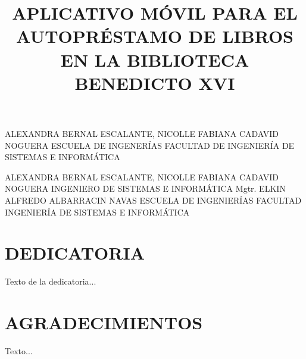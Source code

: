 \documentclass[spanish]{ieee_upb}
\title{APLICATIVO MÓVIL PARA EL AUTOPRÉSTAMO DE LIBROS EN LA BIBLIOTECA BENEDICTO XVI}
\date{\the\year}
\begin{document}
\setlength{\headheight}{15pt}

{ALEXANDRA BERNAL ESCALANTE, NICOLLE FABIANA CADAVID NOGUERA}
{ESCUELA DE INGENERÍAS}
{FACULTAD DE INGENIERÍA DE SISTEMAS E INFORMÁTICA}

\newpage
{}
{ALEXANDRA BERNAL ESCALANTE, NICOLLE FABIANA CADAVID NOGUERA}
{INGENIERO DE SISTEMAS E INFORMÁTICA}
{Mgtr. ELKIN ALFREDO ALBARRACIN NAVAS}
{ESCUELA DE INGENIERÍAS}
{FACULTAD INGENIERÍA DE SISTEMAS E INFORMÁTICA}
\newpage
\section*{DEDICATORIA}
Texto de la dedicatoria...

\clearpage
\section*{AGRADECIMIENTOS}
Texto...

\clearpage
\renewcommand\contentsname{\hfill\normalfont\bfseries CONTENIDO\hfill}
\tableofcontents

\renewcommand{\thetable}{\Roman{table}}


\makeatletter
\renewcommand{\numberline}[1]{%
  \stepcounter{tabindexcounter}%
  Tabla~\arabic{tabindexcounter}~%
}
\makeatother


\newpage
{} 
\renewcommand\listtablename{\hfill\normalfont\bfseries LISTA DE TABLAS\hfill}
\listoftables

\newpage
\renewcommand\listfigurename{\hfill\normalfont\bfseries LISTA DE FIGURAS\hfill}
\listoffigures

\clearpage
\renewcommand\lstlistlistingname{\hfill\normalfont\bfseries LISTA DE PSEUDOCÓDIGOS\hfill}
\renewcommand{\lstlistingname}{Pseudocódigo}
\lstlistoflistings
\end{document}
